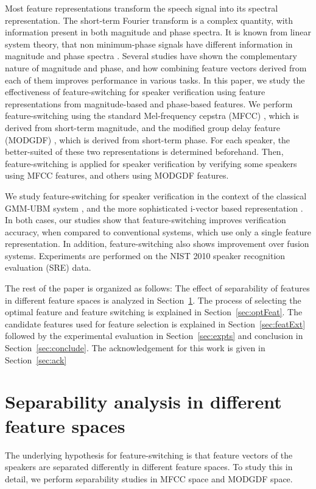 \documentclass[preprint,12pt,5p]{elsarticle}
\begin{document}
Most feature representations transform the speech signal into its spectral
representation. The short-term Fourier transform is a complex quantity, with
information present in both magnitude and phase spectra. It is known from linear
system theory, that non minimum-phase signals have different information in
magnitude and phase spectra \cite{oppenheim}. Several studies \cite{complement2}
have shown the complementary nature of magnitude and phase, and how combining feature
vectors derived from each of them improves performance in various tasks. In this
paper, we study the effectiveness of feature-switching for speaker verification
using feature representations from magnitude-based and phase-based features. We
perform feature-switching using the standard Mel-frequency cepstra (MFCC)
\cite{mfcc}, which is derived from short-term magnitude, and the modified group 
delay feature (MODGDF) \cite{hegdeModgdf}, which is derived from short-term phase.
For each speaker, the better-suited of these two representations is determined
beforehand. Then, feature-switching is applied for speaker verification by verifying
some speakers using MFCC features, and others using MODGDF features.

We study feature-switching for speaker verification in the context of the
classical GMM-UBM system \cite{reynoldsAdaptedGMM}, and the more
sophisticated i-vector based representation \cite{dehak_ivector}. In both cases,
our studies show that feature-switching improves verification accuracy, when
compared to conventional systems, which use only a single feature
representation. In addition, feature-switching also shows improvement over
fusion systems. Experiments are performed on the NIST 2010 speaker recognition
evaluation (SRE) \cite{nist2010SRE} data.

The rest of the paper is organized as follows: The effect of separability of features 
in different feature spaces is analyzed in Section~\ref{sec:separability}. The process 
of selecting the optimal feature and feature switching is explained in 
Section~\ref{sec:optFeat}. The candidate features used for 
feature selection is explained in Section~\ref{sec:featExt} followed by the experimental 
evaluation in Section~\ref{sec:expts} and conclusion in Section~\ref{sec:conclude}. The 
acknowledgement for this work is given in Section~\ref{sec:ack}

\section{Separability analysis in different feature spaces}
\label{sec:separability}
The underlying hypothesis for feature-switching is that feature vectors of the 
speakers are separated differently in different feature spaces. To study this in detail, we
perform separability studies in MFCC space and MODGDF space.
\end{document}

